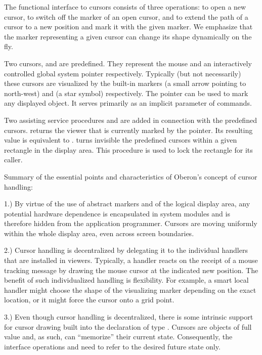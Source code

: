 The functional interface to cursors consists of three operations:
 to open a new cursor,  to switch off the marker
of an open cursor, and  to extend the path of a cursor to a
new position and mark it with the given marker. We emphasize that the
marker representing a given cursor can change its shape dynamically on
the fly.

Two cursors,  and  are predefined. They represent the
mouse and an interactively controlled global system pointer
respectively. Typically (but not necessarily) these cursors are
visualized by the built-in markers  (a small arrow pointing to
north-west) and  (a star symbol) respectively. The pointer can be
used to mark any displayed object. It serves primarily as an implicit
parameter of commands.

Two assisting service procedures  and  are
added in connection with the predefined cursors.  returns
the viewer that is currently marked by the pointer. Its resulting
value is equivalent to . 
turns invisible the predefined cursors within a given rectangle in the
display area. This procedure is used to lock the rectangle for its
caller.

Summary of the essential points and characteristics of Oberon's concept of cursor handling:

1.) By virtue of the use of abstract markers and of the logical display area, any potential hardware dependence is encapsulated in system modules and is therefore hidden from the application programmer. Cursors are moving uniformly within the whole display area, even across screen boundaries.

2.) Cursor handling is decentralized by delegating it to the individual handlers that are installed in viewers. Typically, a handler reacts on the receipt of a mouse tracking message by drawing the mouse cursor at the indicated new position. The benefit of such individualized handling is flexibility. For example, a smart local handler might choose the shape of the visualizing marker depending on the exact location, or it might force the cursor onto a grid point.

3.) Even though cursor handling is decentralized, there is some intrinsic support for cursor drawing built into the declaration of type . Cursors are objects of full value and, as such, can ``memorize'' their current state. Consequently, the interface operations  and  need to refer to the desired future state only.

